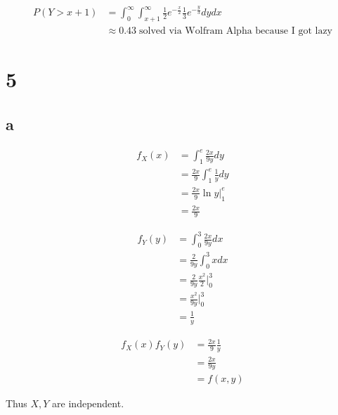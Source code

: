 \documentclass[10pt]{article}
\begin{document}
\begin{align*}
    P(Y>x+1) &= \int_0^\infty\int_{x+1}^\infty 
    \frac{1}{2}e^{-\frac{x}{2}}\frac{1}{3}e^{-\frac{y}{3}}dydx\\
    &\approx 0.43\; \text{solved via Wolfram Alpha because I got lazy}
\end{align*}

\section*{5}
\subsection*{a}

\begin{align*}
    f_X(x) &= \int_1^e\frac{2x}{9y}dy\\
    &= \frac{2x}{9}\int_1^e\frac{1}{y}dy\\
    &=\frac{2x}{9}\ln y\Bigr |_1^e\\
    &=\frac{2x}{9}
\end{align*}

\begin{align*}
    f_Y(y) &= \int_0^3\frac{2x}{9y}dx\\
    &= \frac{2}{9y}\int_0^3xdx\\
    &=\frac{2}{9y} \frac{x^2}{2}\Bigr |_0^3\\
    &= \frac{x^2}{9y} \Bigr |_0^3\\
    &= \frac{1}{y}
\end{align*}


\begin{align*}
    f_X(x)f_Y(y) &= \frac{2x}{9}\frac{1}{y}\\
    &= \frac{2x}{9y}\\
    &= f(x,y)
\end{align*}

Thus $X,Y$ are independent.
\end{document}

